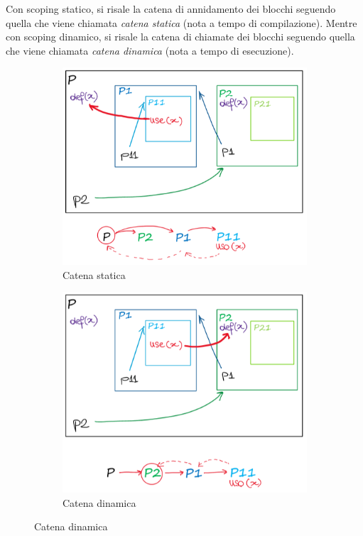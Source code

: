 \documentclass[a4paper,oneside,titlepage]{book}
\begin{document}
\newpage
\noindent
Con scoping statico, si risale la catena di annidamento dei blocchi seguendo quella che viene chiamata \textit{catena statica} (nota a tempo di compilazione). Mentre con scoping dinamico, si risale la catena di chiamate dei blocchi seguendo quella che viene chiamata \textit{catena dinamica} (nota a tempo di esecuzione).
\begin{figure}[htp]
	\begin{subfigure}{0.49\textwidth}
		\includegraphics[width=\textwidth, height=\textheight, keepaspectratio]{catenaStatica.png} 
		\caption{Catena statica}
	\end{subfigure}
	\hfill
	\begin{subfigure}{0.49\textwidth}
		\includegraphics[width=\textwidth, height=\textheight, keepaspectratio]{catenaDinamica.png}
		\caption{Catena dinamica}
	\end{subfigure}
\end{figure}
\end{document}
